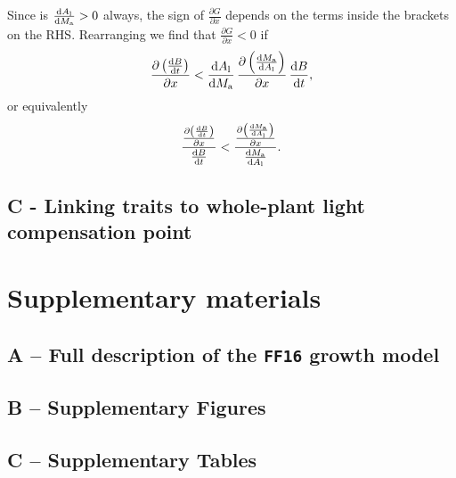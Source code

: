 \documentclass[a4paper,11pt]{article}
\begin{document}
Since is $\frac{{\rm d}A_{\rm l}} {{\rm d}M_{\rm a}}>0$ always, the sign
of $\frac{\partial G} {\partial x}$ depends on the terms inside the brackets on the
RHS. Rearranging we find that $\frac
{\partial G} {\partial x} < 0$ if
\begin{equation}\label{eq:dg3}
\frac{\partial \left( \frac{ {\rm d}B} {{\rm d}t}\right)}{\partial x}
< \frac{{\rm d}A_{\rm l}} {{\rm d}M_{\rm a}}
\,  \frac{\partial \left(\frac{{\rm d}M_{\rm a}} {{\rm d}A_{\rm l}}\right)
}{\partial x} \, \frac{ {\rm d}B} {{\rm d}t},
\end{equation}
or equivalently
\begin{equation}\label{eq:dg4_orig}
\frac{
\frac{\partial \left( \frac{ {\rm d}B} {{\rm d}t}\right)}{\partial x} }
{\frac{ {\rm d}B} {{\rm d}t}}
<
\frac{ \frac{\partial \left(\frac{{\rm d}M_{\rm a}} {{\rm d}A_{\rm l}}\right)
}{\partial x}}{\frac{{\rm d}M_{\rm a}} {{\rm d}A_{\rm l}}}.
\end{equation}

\subsection{C - Linking traits to whole-plant light compensation point} \label{app:traits-RGR}

\section{Supplementary materials}

\subsection{A -- Full description of the \texttt{FF16} growth model}\label{sec:ff16}

\subsection{B -- Supplementary Figures}\label{sec:SM_figs}

\subsection{C -- Supplementary Tables}\label{sec:SM_tabs}

\footnotesize


\end{document}
